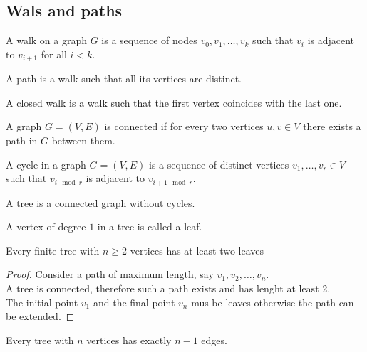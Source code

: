 \documentclass[../main.tex]{subfiles}
\begin{document}
\subsection{Wals and paths}
\begin{defn}[Walk]
A walk on a graph $G$ is a sequence of nodes $v_0, v_1, \ldots, v_k$ such that $v_i$ is adjacent to $v_{i+1} $ for all $i<k$.
\end{defn}
\begin{defn}[Path]
	A path is a walk such that all its vertices are distinct.
\end{defn}
\begin{defn}
	A closed walk is a walk such that the first vertex coincides with the last one.
\end{defn}
\begin{defn}
	A graph $G= ( V,E) $ is connected if for every two vertices $u,v \in V$ there exists a path in $G$ between them.
\end{defn}
\begin{defn}[Cycle]
	A cycle in a graph $G= ( V,E) $ is a sequence of distinct vertices $v_1, \ldots, v_r \in V$ such that $v_{ i \mod r} $ is adjacent to $v_{i+1 \mod r} $.
\end{defn}
\begin{defn}[Tree]
	A tree is a connected graph without cycles.
\end{defn}
\begin{defn}[Leaf]
	A vertex of degree $1$ in a tree is called a leaf.
\end{defn}
\begin{lemma}
	Every finite tree with $n \geq 2$ vertices has at least two leaves
\end{lemma}
\begin{proof}
	Consider a path of maximum length, say $v_1, v_2, \ldots, v_n$.\\
	A tree is connected, therefore such a path exists and has lenght at least 2.\\
	The initial point $v_1$ and the final point $v_n$ mus be leaves otherwise the path can be extended.
\end{proof}
\begin{lemma}
Every tree with $n$ vertices has exactly $n-1$ edges.
\end{lemma}
\end{document}
